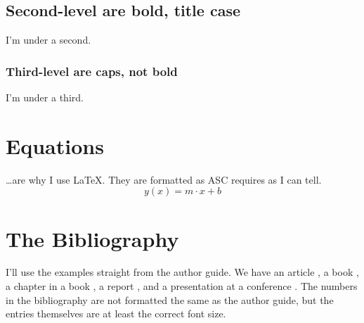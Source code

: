 \documentclass[]{asc}
\begin{document}
\subsection*{Second-level are bold, title case}

I'm under a second.

\subsubsection*{Third-level are caps, not bold}

I'm under a third.

\section*{Equations}

\dots are why I use \LaTeX .
They are formatted as ASC requires as I can tell.
\begin{equation}
    y(x) = m \cdot x + b
\end{equation}

\section*{The Bibliography}

I'll use the examples straight from the author guide.
We have an article \cite{ikegami1990}, a book \cite{mitsiti1996}, a chapter in a book \cite{inman1998}, a report \cite{margarit1993}, and a presentation at a conference \cite{hoffer1996}.
The numbers in the bibliography are not formatted the same as the author guide, but the entries themselves are at least the correct font size.



\end{document}
